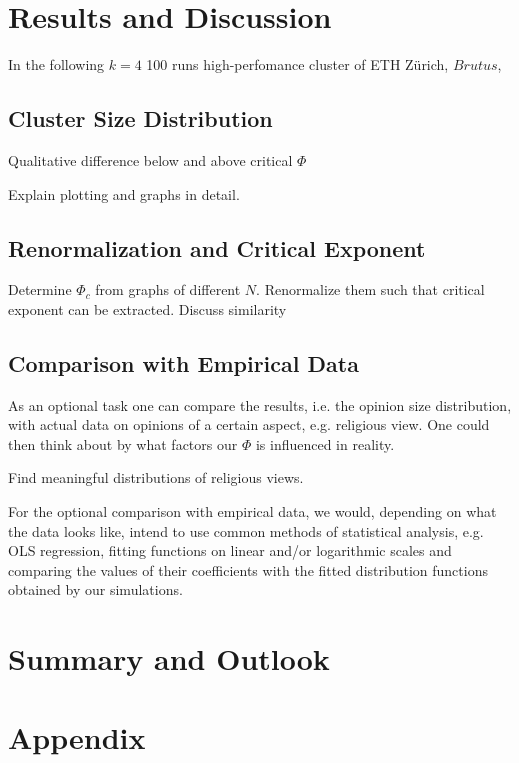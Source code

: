 \documentclass[11pt]{article}
\begin{document}
\section{Results and Discussion}

In the following $k = 4$ 
100 runs
high-perfomance cluster of ETH Zürich, $Brutus$,


\subsection{Cluster Size Distribution}

Qualitative difference below and above critical $\Phi$

Explain plotting and graphs in detail.

\subsection{Renormalization and Critical Exponent}

Determine $\Phi_c$ from graphs of different $N$. Renormalize them such that critical exponent can be extracted. Discuss similarity





\subsection{Comparison with Empirical Data}

As an optional task one can compare the results, i.e. the opinion size distribution, with actual data on opinions of a certain aspect, e.g. religious view. One could then think about by what factors our $\Phi$ is influenced in reality.

Find meaningful distributions of religious views.

For the optional comparison with empirical data, we would, depending on what the data looks like, intend to use common methods of statistical analysis, e.g. OLS regression, fitting functions on linear and/or logarithmic scales and comparing the values of their coefficients with the fitted distribution functions obtained by our simulations.

\section{Summary and Outlook}

\section{Appendix}
\end{document}
